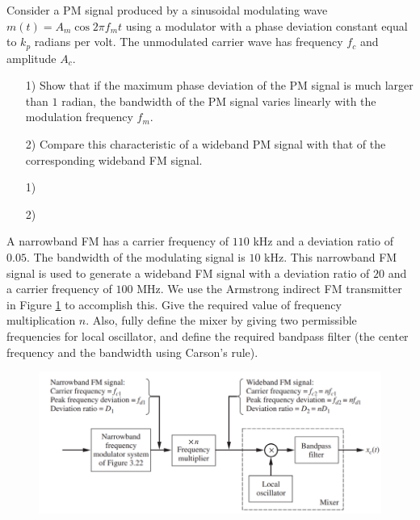 \documentclass{assignment}
\begin{document}
\begin{prob}
    Consider a PM signal produced by a sinusoidal modulating wave $m(t)=A_m\cos 2\pi f_mt$ using a modulator with a phase deviation constant equal to $k_p$ radians per volt. The unmodulated carrier wave has frequency $f_c$ and amplitude $A_c$.
    \begin{itemize}
        \item[1)] Show that if the maximum phase deviation of the PM signal is much larger than $1$ radian, the bandwidth of the PM signal varies linearly with the modulation frequency $f_m$.
        \item[2)] Compare this characteristic of a wideband PM signal with that of the corresponding wideband FM signal.
    \end{itemize}
\end{prob}
\begin{sol}
    \begin{itemize}
        \item[1)] 
        \item[2)] 
    \end{itemize}
\end{sol}

\begin{prob}
    A narrowband FM has a carrier frequency of $110$ kHz and a deviation ratio of $0.05$. The bandwidth of the modulating signal is $10$ kHz. This narrowband FM signal is used to generate a wideband FM signal with a deviation ratio of $20$ and a carrier frequency of $100$ MHz. We use the Armstrong indirect FM transmitter in Figure \ref{A-5-P-5} to accomplish this. Give the required value of frequency multiplication $n$. Also, fully define the mixer by giving two permissible frequencies for local oscillator, and define the required bandpass filter (the center frequency and the bandwidth using Carson's rule).
    \begin{figure}[h]
        \centering
        \includegraphics[width=.8\columnwidth]{Assignment-5-Problem-5.png}
        \caption{}
        \label{A-5-P-5}
    \end{figure}
\end{prob}
\begin{sol}
    
\end{sol}
\end{document}

